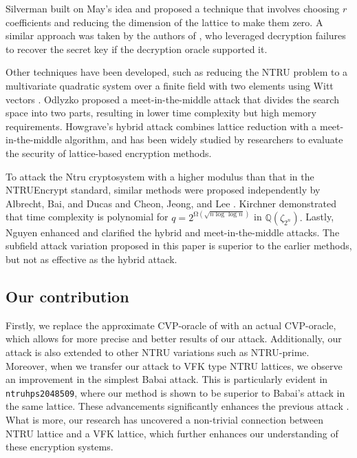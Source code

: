\documentclass{amsart}
\numberwithin{equation}{section}
\begin{document}
Silverman \cite{Silverman} built on May's idea and proposed a technique that involves choosing $r$ coefficients and reducing the dimension of the lattice to make them zero. A similar approach was taken by the authors of \cite{Gama-Nguyen}, who leveraged decryption failures to recover the secret key if the decryption oracle supported it.

Other techniques have been developed, such as reducing the NTRU problem to a multivariate quadratic system over a finite field with two elements using Witt vectors \cite{gerald,witt}. Odlyzko \cite{Odlyzko} proposed a meet-in-the-middle attack that divides the search space into two parts, resulting in lower time complexity but high memory requirements. Howgrave's hybrid attack \cite{hybrid attack} combines lattice reduction with a meet-in-the-middle algorithm, and has been widely studied by researchers to evaluate the security of lattice-based encryption methods.

To attack the Ntru cryptosystem with a higher modulus than that in the NTRUEncrypt standard, similar methods were proposed independently by Albrecht, Bai, and Ducas \cite{Albrecht} and Cheon, Jeong, and Lee \cite{Cheon}. Kirchner \cite{Kirchner} demonstrated that time complexity is polynomial for $q=2^{\mathrm {\Omega }(\sqrt{n\log \log n})}$ in $\mathbb {Q}(\zeta _{2^n}).$ Lastly, Nguyen \cite{Nguyen - Boosting the hybrid} enhanced and clarified the hybrid and meet-in-the-middle attacks. The subfield attack variation proposed in this paper is superior to the earlier methods, but not as effective as the hybrid attack.


\subsection{Our contribution}
Firstly, we replace the approximate CVP-oracle of \cite{adam_draz} with an actual CVP-oracle, which allows for more precise and better results of our attack. Additionally, our attack is also extended to other NTRU variations such as NTRU-prime. Moreover, when we transfer our attack to VFK type NTRU lattices, we observe an improvement in the simplest Babai attack. This is particularly evident in \texttt{ntruhps2048509}, where our method is shown to be superior to Babai's attack in the same lattice. These advancements significantly  enhances the previous attack \cite{adam_draz}. What is more, our research has uncovered a non-trivial connection between NTRU lattice and a VFK lattice, which further enhances our understanding of these encryption systems. 
\end{document}
